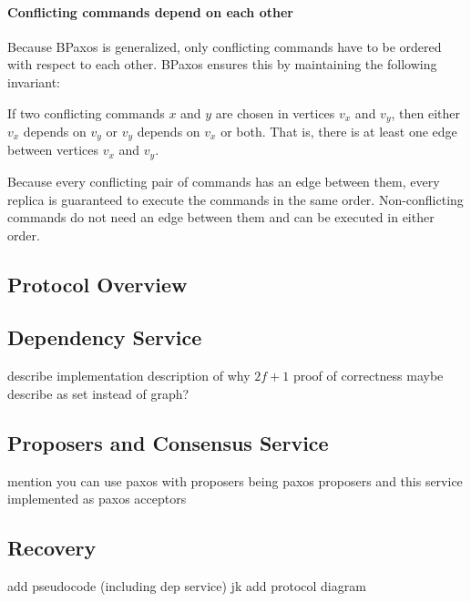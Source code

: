 {}

\paragraph{Conflicting commands depend on each other}
Because BPaxos is generalized, only conflicting commands have to be ordered
with respect to each other. BPaxos ensures this by maintaining the following
invariant:
\begin{invariant}
  If two conflicting commands $x$ and $y$ are chosen in vertices $v_x$ and
  $v_y$, then either $v_x$ depends on $v_y$ or $v_y$ depends on $v_x$ or both.
  That is, there is at least one edge between vertices $v_x$ and $v_y$.
\end{invariant}
Because every conflicting pair of commands has an edge between them, every
replica is guaranteed to execute the commands in the same order.
Non-conflicting commands do not need an edge between them and can be executed
in either order.

\subsection{Protocol Overview}

\subsection{Dependency Service}
describe implementation
description of why $2f+1$
proof of correctness
maybe describe as set instead of graph?

\subsection{Proposers and Consensus Service}
mention you can use paxos with proposers being paxos proposers and this service
implemented as paxos acceptors


\subsection{Recovery}

add pseudocode (including dep service) jk
add protocol diagram
